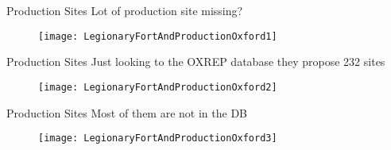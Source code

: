 \documentclass{beamer}
\begin{document}
\begin{frame}{Production Sites}
	Lot of production site missing?
	\begin{figure}[htp]
		\begin{center}
			\texttt{[image: LegionaryFortAndProductionOxford1]}
		\end{center}
	\end{figure}
\end{frame}
\begin{frame}{Production Sites}
	Just looking to the OXREP database they propose 232 sites
	\begin{figure}[htp]
		\begin{center}
			\texttt{[image: LegionaryFortAndProductionOxford2]}
		\end{center}
	\end{figure}
\end{frame}
\begin{frame}{Production Sites}
	Most of them are not in the DB
	\begin{figure}[htp]
		\begin{center}
			\texttt{[image: LegionaryFortAndProductionOxford3]}
		\end{center}
	\end{figure}
\end{frame}
\end{document}
